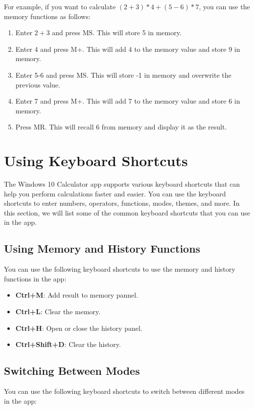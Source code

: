 \documentclass[12pt]{article}
\begin{document}
For example, if you want to calculate $(2+3)*4+(5-6)*7$, you can use the memory functions as follows:

\begin{enumerate}
    \item Enter $2+3$ and press MS. This will store 5 in memory.
    \item Enter 4 and press M+. This will add 4 to the memory value and store 9 in memory.
    \item Enter 5-6 and press MS. This will store -1 in memory and overwrite the previous value.
    \item Enter 7 and press M+. This will add 7 to the memory value and store 6 in memory.
    \item Press MR. This will recall 6 from memory and display it as the result.
\end{enumerate}

\pagebreak

\section{Using Keyboard Shortcuts}
The Windows 10 Calculator app supports various keyboard shortcuts that can help you perform calculations faster and easier. You can use the keyboard shortcuts to enter numbers, operators, functions, modes, themes, and more. In this section, we will list some of the common keyboard shortcuts that you can use in the app.

\subsection{Using Memory and History Functions}
You can use the following keyboard shortcuts to use the memory and history functions in the app\cite{calculator-shortcuts}:

\begin{itemize}
    \item \textbf{Ctrl+M}: Add result to memory pannel.
    \item \textbf{Ctrl+L}: Clear the memory.
    \item \textbf{Ctrl+H}: Open or close the history panel.
    \item \textbf{Ctrl+Shift+D}: Clear the history.
\end{itemize}

\subsection{Switching Between Modes}
You can use the following keyboard shortcuts to switch between different modes in the app\cite{calculator-shortcuts}:
\end{document}
